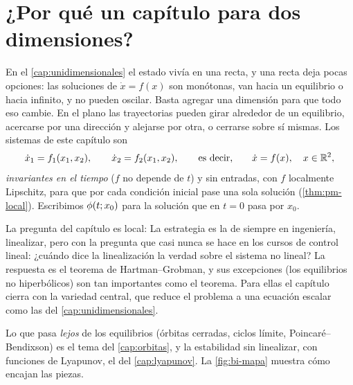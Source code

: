 \section{¿Por qué un capítulo para dos dimensiones?}
\label{sec:bi-porque}

En el \cref{cap:unidimensionales} el estado vivía en una recta, y una recta deja pocas opciones: las soluciones de $\dot x=f(x)$ son monótonas, van hacia un equilibrio o hacia infinito, y no pueden oscilar. Basta agregar una dimensión para que todo eso cambie. En el plano las trayectorias pueden girar alrededor de un equilibrio, acercarse por una dirección y alejarse por otra, o cerrarse sobre sí mismas. Los sistemas de este capítulo son
\begin{equation}
  \dot x_1=f_1(x_1,x_2),\qquad \dot x_2=f_2(x_1,x_2),\qquad\text{es decir,}\qquad \dot x=f(x),\quad x\in\mathbb{R}^2 ,
  \label{eq:bi-sistema}
\end{equation}
\emph{invariantes en el tiempo} ($f$ no depende de $t$) y sin entradas, con $f$ localmente Lipschitz, para que por cada condición inicial pase una sola solución (\cref{thm:pm-local}). Escribimos $\phi(t;x_0)$ para la solución que en $t=0$ pasa por $x_0$.

La pregunta del capítulo es local:  La estrategia es la de siempre en ingeniería, linealizar, pero con la pregunta que casi nunca se hace en los cursos de control lineal: ¿cuándo dice la linealización la verdad sobre el sistema no lineal? La respuesta es el teorema de Hartman--Grobman, y sus excepciones (los equilibrios no hiperbólicos) son tan importantes como el teorema. Para ellas el capítulo cierra con la variedad central, que reduce el problema a una ecuación escalar como las del \cref{cap:unidimensionales}.


Lo que pasa \emph{lejos} de los equilibrios (órbitas cerradas, ciclos límite, Poincaré--Bendixson) es el tema del \cref{cap:orbitas}, y la estabilidad sin linealizar, con funciones de Lyapunov, el del \cref{cap:lyapunov}. La \cref{fig:bi-mapa} muestra cómo encajan las piezas.

